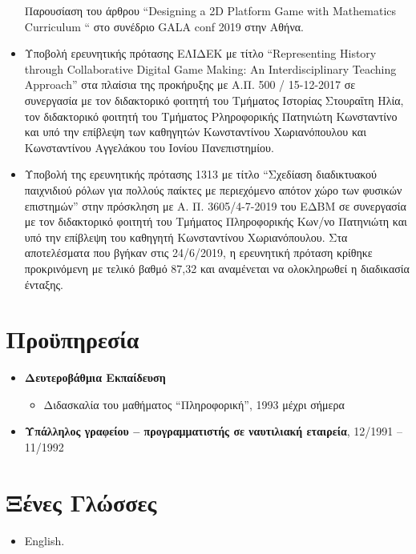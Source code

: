 \documentclass[%
    11pt,
  oneside
  ]{memoir}
\let\oldsection\section
\renewcommand{\section}[1]{%
  \oldsection{#1}
  \leavevmode
  \par
  \vspace{\dimexpr-\baselineskip-\parskip}
}
\begin{document}
\begin{itemize}
  Παρουσίαση του άρθρου ``Designing a 2D Platform Game with Mathematics
  Curriculum `` στο συνέδριο GALA conf 2019 στην Αθήνα.
\item
  Υποβολή ερευνητικής πρότασης ΕΛΙΔΕΚ με τίτλο ``Representing History
  through Collaborative Digital Game Making: An Interdisciplinary
  Teaching Approach'' στα πλαίσια της προκήρυξης με Α.Π. 500 /
  15-12-2017 σε συνεργασία με τον διδακτορικό φοιτητή του Tμήματος
  Ιστορίας Στουραΐτη Ηλία, τον διδακτορικό φοιτητή του Tμήματος
  Pληροφορικής Πατηνιώτη Κωνσταντίνο και υπό την επίβλεψη των καθηγητών
  Κωνσταντίνου Χωριανόπουλου και Κωνσταντίνου Αγγελάκου του Ιονίου
  Πανεπιστημίου.
\item
  Υποβολή της ερευνητικής πρότασης 1313 με τίτλο ``Σχεδίαση διαδικτυακού
  παιχνιδιού ρόλων για πολλούς παίκτες με περιεχόμενο απότον χώρο των
  φυσικών επιστημών'' στην πρόσκληση με Α. Π. 3605/4-7-2019 του ΕΔΒΜ σε
  συνεργασία με τον διδακτορικό φοιτητή του Τμήματος Πληροφορικής Κων/νο
  Πατηνιώτη και υπό την επίβλεψη του καθηγητή Κωνσταντίνου
  Χωριανόπουλου. Στα αποτελέσματα που βγήκαν στις 24/6/2019, η
  ερευνητική πρόταση κρίθηκε προκρινόμενη με τελικό βαθμό 87,32 και
  αναμένεται να ολοκληρωθεί η διαδικασία ένταξης.
\end{itemize}

\hypertarget{ux3c0ux3c1ux3bfux3cbux3c0ux3b7ux3c1ux3b5ux3c3ux3afux3b1}{%
\section{Προϋπηρεσία}\label{ux3c0ux3c1ux3bfux3cbux3c0ux3b7ux3c1ux3b5ux3c3ux3afux3b1}}

\begin{itemize}
\tightlist
\item
  \textbf{Δευτεροβάθμια Εκπαίδευση}

  \begin{itemize}
  \tightlist
  \item
    Διδασκαλία του μαθήματος ``Πληροφορική'', 1993 μέχρι σήμερα
  \end{itemize}
\item
  \textbf{Υπάλληλος γραφείου -- προγραμματιστής σε ναυτιλιακή εταιρεία},
  12/1991 -- 11/1992
\end{itemize}

\hypertarget{ux3beux3adux3bdux3b5ux3c2-ux3b3ux3bbux3ceux3c3ux3c3ux3b5ux3c2}{%
\section{Ξένες
Γλώσσες}\label{ux3beux3adux3bdux3b5ux3c2-ux3b3ux3bbux3ceux3c3ux3c3ux3b5ux3c2}}

\begin{itemize}
\tightlist
\item
  English.
\end{itemize}
\end{document}
